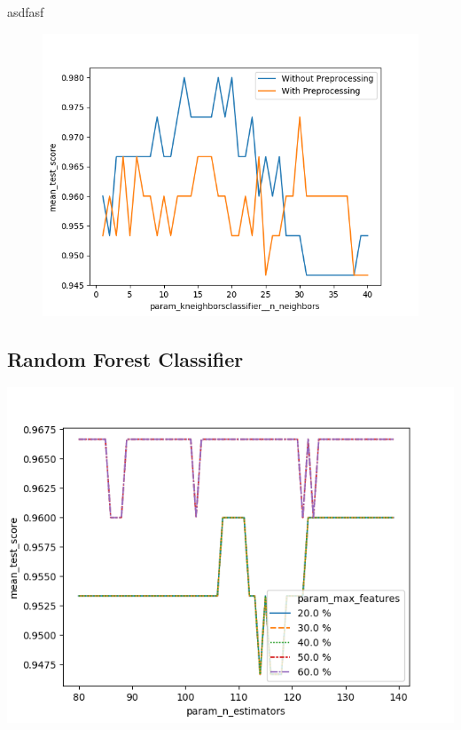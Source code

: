 \documentclass{article}
\begin{document}
asdfasf

\begin{figure}[ht]
\includegraphics[width=\textwidth]{plots/knn_np_p_comparision.png}
\end{figure}

\subsection{Random Forest Classifier}
\includegraphics[width=\textwidth]{plots/rf_np_comparision.png}
\end{document}
